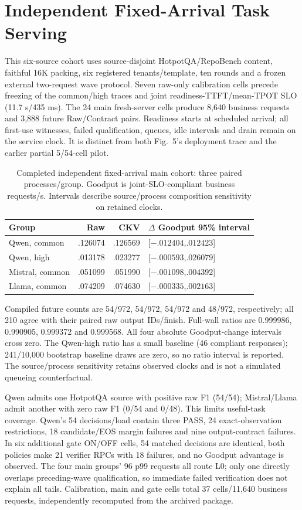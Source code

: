 \section{Independent Fixed-Arrival Task Serving}
\label{sec:s-task-arrivals}
This six-source cohort uses source-disjoint HotpotQA/RepoBench content, faithful 16K packing, six registered tenants/template, ten rounds and a frozen external two-request wave protocol. Seven raw-only calibration cells precede freezing of the common/high traces and joint readiness-TTFT/mean-TPOT SLO (11.7 s/435 ms). The 24 main fresh-server cells produce 8,640 business requests and 3,888 future Raw/Contract pairs. Readiness starts at scheduled arrival; all first-use witnesses, failed qualification, queues, idle intervals and drain remain on the service clock. It is distinct from both Fig.~5's deployment trace and the earlier partial 5/54-cell pilot.

\begin{table}[t]
\centering\footnotesize
\setlength{\tabcolsep}{2.5pt}
\caption{Completed independent fixed-arrival main cohort: three paired processes/group. Goodput is joint-SLO-compliant business requests/s. Intervals describe source/process composition sensitivity on retained clocks.}
\label{tab:s-task-arrivals}
\begin{tabular}{@{}lrrP{1.24in}@{}}
\toprule
Group & Raw & CKV & $\Delta$ Goodput 95\% interval\\
\midrule
Qwen, common & .126074 & .126569 & [$-.012404$,$.012423$]\\
Qwen, high & .013178 & .023277 & [$-.000593$,$.026079$]\\
Mistral, common & .051099 & .051990 & [$-.001098$,$.004392$]\\
Llama, common & .074209 & .074630 & [$-.000335$,$.002163$]\\
\bottomrule
\end{tabular}
\end{table}

Compiled future counts are 54/972, 54/972, 54/972 and 48/972, respectively; all 210 agree with their paired raw output IDs/finish. Full-wall ratios are 0.999986, 0.990905, 0.999372 and 0.999568. All four absolute Goodput-change intervals cross zero. The Qwen-high ratio has a small baseline (46 compliant responses); 241/10,000 bootstrap baseline draws are zero, so no ratio interval is reported. The source/process sensitivity retains observed clocks and is not a simulated queueing counterfactual.

Qwen admits one HotpotQA source with positive raw F1 (54/54); Mistral/Llama admit another with zero raw F1 (0/54 and 0/48). This limits useful-task coverage. Qwen's 54 decisions/load contain three PASS, 24 exact-observation restrictions, 18 candidate/EOS margin failures and nine output-contract failures. In six additional gate ON/OFF cells, 54 matched decisions are identical, both policies make 21 verifier RPCs with 18 failures, and no Goodput advantage is observed. The four main groups' 96 p99 requests all route L0; only one directly overlaps preceding-wave qualification, so immediate failed verification does not explain all tails. Calibration, main and gate cells total 37 cells/11,640 business requests, independently recomputed from the archived package.

